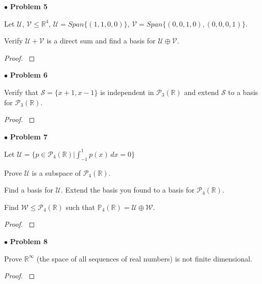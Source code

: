\documentclass{article}
\begin{document}
\newpage
$ \bullet$ \textbf{Problem 5}
\medskip

\begin{itshape}
Let $\mathcal{U}$, $\mathcal{V} \le \mathbb{R}^4$, $\mathcal{U} = Span \{ (1,1,0,0) \}$, $\mathcal{V} = Span \{ (0,0,1,0), (0,0,0,1) \}$.

Verify $\mathcal{U} + \mathcal{V}$ is a direct sum and find a basis for $\mathcal{U} \oplus \mathcal{V}$.
\end{itshape}
\medskip

\begin{proof}
$ $\newline
\end{proof}

\newpage
$ \bullet$ \textbf{Problem 6}
\medskip

\begin{itshape}
Verify that $\mathcal{S} = \{ x+1, x-1 \}$ is independent in $\mathcal{P}_{3} (\mathbb{R})$ and extend $\mathcal{S}$ to a basis for $\mathcal{P}_{3} (\mathbb{R})$.
\end{itshape}
\medskip

\begin{proof}
$ $\newline
\end{proof}

\newpage
$ \bullet$ \textbf{Problem 7}
\medskip

\begin{itshape}
Let $\mathcal{U} = \{ p \in \mathcal{P}_4(\mathbb{R}) | \int_{-1}^1 p(x) \,dx = 0 \}$

Prove $\mathcal{U}$ is a subspace of $\mathcal{P}_4 (\mathbb{R})$.

Find a basis for $\mathcal{U}$. Extend the basis you found to a basis for $\mathcal{P}_4(\mathbb{R})$.

Find $\mathcal{W} \le \mathcal{P}_4(\mathbb{R})$ such that $\mathbb{P}_4(\mathbb{R}) = \mathcal{U} \oplus \mathcal{W}$.
\end{itshape}
\medskip

\begin{proof}
$ $\newline
\end{proof}

\newpage
$ \bullet$ \textbf{Problem 8}
\medskip

\begin{itshape}
Prove $\mathbb{R}^ \infty$ (the space of all sequences of real numbers) is not finite dimensional.
\end{itshape}
\medskip

\begin{proof}
$ $\newline
\end{proof}
\end{document}
